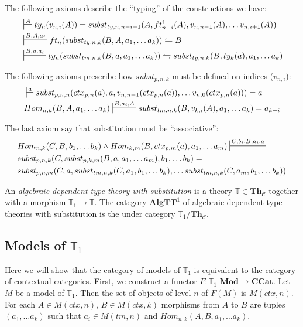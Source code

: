 \documentclass[reqno]{amsart}
\theoremstyle{definition}
\theoremstyle{remark}
\newcommand{\cat}[1]{\mathbf{#1}}
\newcommand{\ccat}{\cat{CCat}}
\newcommand{\algtt}{\cat{AlgTT}}
\newcommand{\Mod}[1]{#1\text{-}\cat{Mod}}
\newcommand{\Th}{\cat{Th}}
\newcommand{\ThC}{\Th_{\mathcal{C}}}
\numberwithin{figure}{section}
\begin{document}
The following axioms describe the ``typing'' of the constructions we have:
\begin{align}
\label{ax:type-var}
& \sststile{}{A}         ty_n(v_{n,i}(A)) = subst_{ty,n,n-i-1}(A, ft^i_{n-i}(A), v_{n,n-1}(A), \ldots v_{n,i+1}(A)) \\
\label{ax:type-subst-ty}
& \sststile{}{B, A, a_i} ft_n(subst_{ty,n,k}(B, A, a_1, \ldots a_k)) \leftrightharpoons B \\
\label{ax:type-subst-tm}
& \sststile{}{B, a, a_i} ty_n(subst_{tm,n,k}(B, a, a_1, \ldots a_k)) \leftrightharpoons subst_{ty,n,k}(B, ty_k(a), a_1, \ldots a_k)
\end{align}

The following axioms prescribe how $subst_{p,n,k}$ must be defined on indices ($v_{n,i}$):
\begin{align}
\label{ax:subst-var}
& \sststile{}{a}         subst_{p,n,n}(ctx_{p,n}(a), a, v_{n,n-1}(ctx_{p,n}(a)), \ldots v_{n,0}(ctx_{p,n}(a))) = a \\
\label{ax:var-subst}
& Hom_{n,k}(B, A, a_1, \ldots a_k) \sststile{}{B, a_i, A} subst_{tm,n,k}(B, v_{k,i}(A), a_1, \ldots a_k) = a_{k-i}
\end{align}

The last axiom say that substitution must be ``associative'':
\begin{align}
\label{ax:subst-subst}
& Hom_{n,k}(C, B, b_1, \ldots b_k) \land Hom_{k,m}(B, ctx_{p,m}(a), a_1, \ldots a_m) \sststile{}{C, b_i, B, a_i, a} \\ \notag
& subst_{p,n,k}(C, subst_{p,k,m}(B, a, a_1, \ldots a_m), b_1, \ldots b_k) = \\ \notag
& subst_{p,n,m}(C, a, subst_{tm,n,k}(C, a_1, b_1, \ldots b_k), \ldots subst_{tm,n,k}(C, a_m, b_1, \ldots b_k))
\end{align}

\begin{defn}
An \emph{algebraic dependent type theory with substitution} is a theory $\mathbb{T} \in \ThC$ together with a morphism $\mathbb{T}_1 \to \mathbb{T}$.
The category $\algtt^1$ of algebraic dependent type theories with substitution is the under category $\mathbb{T}_1/\ThC$.
\end{defn}

\subsection{Models of $\mathbb{T}_1$}

Here we will show that the category of models of $\mathbb{T}_1$ is equivalent to the category of contextual categories.
First, we construct a functor $F : \Mod{\mathbb{T}_1} \to \ccat$.
Let $M$ be a model of $\mathbb{T}_1$.
Then the set of objects of level $n$ of $F(M)$ is $M(ctx,n)$.
For each $A \in M(ctx,n)$, $B \in M(ctx,k)$ morphisms from $A$ to $B$ are tuples $(a_1, \ldots a_k)$ such that $a_i \in M(tm,n)$ and $Hom_{n,k}(A, B, a_1, \ldots a_k)$.
\end{document}
